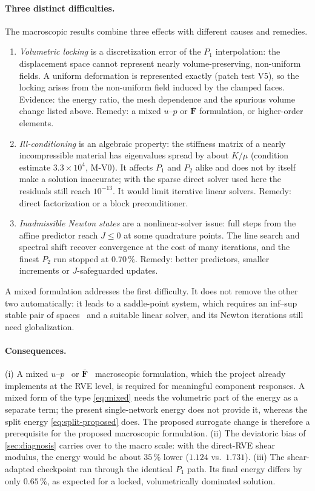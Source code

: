 \paragraph{Three distinct difficulties.} The macroscopic results combine three
effects with different causes and remedies.
\begin{enumerate}
  \item \emph{Volumetric locking} is a discretization error of the $P_1$
        interpolation: the displacement space cannot represent nearly
        volume-preserving, non-uniform fields. A uniform deformation is represented
        exactly (patch test V5), so the locking arises from the non-uniform field
        induced by the clamped faces. Evidence: the energy ratio, the mesh dependence
        and the spurious volume change listed above. Remedy: a mixed $u$--$p$ or
        $\bar{\bm F}$ formulation, or higher-order elements.
  \item \emph{Ill-conditioning} is an algebraic property: the stiffness matrix of a
        nearly incompressible material has eigenvalues spread by about $K/\mu$ (condition
        estimate $3.3\times10^4$, M-V0). It affects $P_1$ and $P_2$ alike and does not
        by itself make a solution inaccurate; with the sparse direct solver used here
        the residuals still reach $10^{-13}$. It would limit iterative linear solvers.
        Remedy: direct factorization or a block preconditioner.
  \item \emph{Inadmissible Newton states} are a nonlinear-solver issue: full steps from
        the affine predictor reach $J\le0$ at some quadrature points. The line search
        and spectral shift recover convergence at the cost of many iterations, and the
        finest $P_2$ run stopped at $0.70\,\%$. Remedy: better predictors, smaller
        increments or $J$-safeguarded updates.
\end{enumerate}
A mixed formulation addresses the first difficulty. It does not remove the other two
automatically: it leads to a saddle-point system, which requires an inf--sup stable
pair of spaces~\cite{Boffi2013} and a suitable linear solver, and its Newton iterations
still need globalization.

\paragraph{Consequences.} (i) A mixed $u$--$p$~\cite{Simo1985} or $\bar{\bm F}$~\cite{deSouzaNeto1996} macroscopic
formulation, which the project already implements at the RVE
level, is required for meaningful component responses. A mixed form of the type
\cref{eq:mixed} needs the volumetric part of the energy as a separate term; the
present single-network energy does not provide it, whereas the split energy
\cref{eq:split-proposed} does. The proposed surrogate change is therefore a
prerequisite for the proposed macroscopic formulation. (ii) The deviatoric bias of
\cref{sec:diagnosis} carries over to the macro scale: with the direct-RVE shear
modulus, the energy would be about $35\,\%$ lower ($1.124$ vs.\ $1.731$). (iii) The
shear-adapted checkpoint ran through the identical $P_1$ path. Its final energy
differs by only $0.65\,\%$, as expected for a locked, volumetrically dominated
solution.

